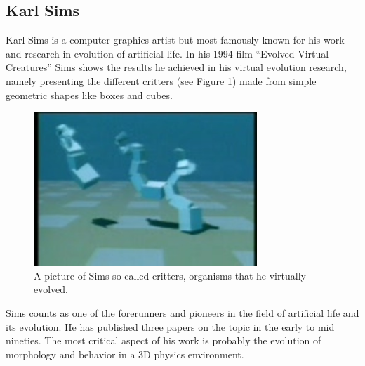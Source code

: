 \documentclass[12pt,oneside,listof=totoc,paper=a4,headings=small]{scrbook}
\begin{document}
\subsection{Karl Sims}
Karl Sims is a computer graphics artist but most famously known for his work and research in evolution of artificial life. In his 1994 film ``Evolved Virtual Creatures'' \cite{sims1994evolving} Sims shows the results he achieved in his virtual evolution research, namely presenting the different critters (see Figure \ref{fig:SimsCritters}) made from simple geometric shapes like boxes and cubes. 
\begin{figure}[h!]
\centering
\includegraphics[width=0.75\textwidth,height=0.75\textheight,keepaspectratio]{images/sims_evolved_virtual_creatures_1994&scale=2.jpeg}
\caption{A picture of Sims so called critters, organisms that he virtually evolved.~\cite{critterssims}}
\label{fig:SimsCritters}
\end{figure}


Sims counts as one of the forerunners and pioneers in the field of artificial life and its evolution. He has published three papers on the topic in the early to mid nineties. The most critical aspect of his work is probably the evolution of morphology and behavior in a 3D physics environment.
\end{document}
